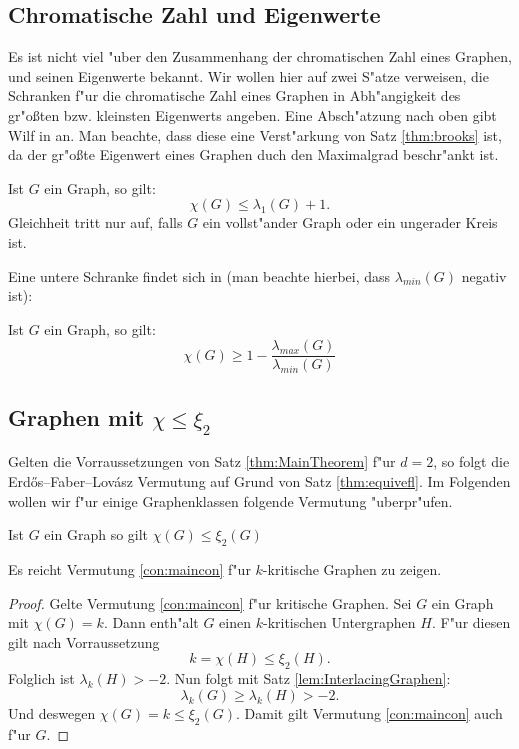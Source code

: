 \subsection{Chromatische Zahl und Eigenwerte}
Es ist nicht viel "uber den Zusammenhang der chromatischen Zahl eines Graphen, und seinen Eigenwerte bekannt. Wir wollen hier auf zwei S"atze verweisen, die Schranken f"ur die chromatische Zahl eines Graphen in Abh"angigkeit des gr"o{\ss}ten bzw. kleinsten Eigenwerts angeben. Eine Absch"atzung nach oben  gibt Wilf in \cite{wilf1967eigenvalues} an. Man beachte, dass diese eine Verst"arkung von Satz \ref{thm:brooks} ist, da der gr"o{\ss}te Eigenwert eines Graphen duch den Maximalgrad
beschr"ankt ist.

\begin{theorem}
  Ist $G$ ein Graph, so gilt: 
  $$\chi(G) \leq \lambda_{1}(G) +1.$$
  Gleichheit tritt nur auf, falls $G$ ein vollst"ander Graph oder ein ungerader Kreis ist.
  \label{thm:wilfev}
\end{theorem}

Eine untere Schranke findet sich in \cite{Hoffmanbounds} (man beachte hierbei, dass $\lambda_{min}(G)$ negativ ist):

\begin{theorem}
  Ist $G$ ein Graph, so gilt:
  $$\chi(G) \geq 1 - \frac{\lambda_{max}(G)}{\lambda_{min}(G)}$$
  \label{thm:Hoffmanev}
\end{theorem}

\subsection{Graphen mit $\chi \leq \xi_{2}$}

Gelten die Vorraussetzungen von Satz \ref{thm:MainTheorem} f"ur $d=2$, so folgt die Erd\H{o}s--Faber--Lov\'asz Vermutung auf Grund von Satz \ref{thm:equivefl}. Im Folgenden wollen wir f"ur einige Graphenklassen folgende Vermutung "uberpr"ufen.
\begin{conjecture}
  Ist $G$ ein Graph so gilt $\chi(G) \leq \xi_{2}(G)$
  \label{con:maincon}
\end{conjecture}

\begin{remark}
  Es reicht Vermutung \ref{con:maincon} f"ur $k$-kritische Graphen zu zeigen. 
\end{remark}

\begin{proof}
  Gelte Vermutung \ref{con:maincon} f"ur kritische Graphen.
  Sei $G$ ein Graph mit $\chi(G) = k$. Dann enth"alt $G$ einen $k$-kritischen Untergraphen $H$. F"ur diesen gilt nach Vorraussetzung $$k= \chi(H) \leq \xi_{2}(H).$$ Folglich ist $\lambda_{k}(H) > -2$. Nun folgt mit Satz \ref{lem:InterlacingGraphen}:
  \begin{equation*}
    \lambda_{k}(G) \geq \lambda_{k}(H) > -2.
  \end{equation*}
  Und deswegen $\chi(G) = k \leq \xi_{2}(G)$.
  Damit gilt Vermutung \ref{con:maincon} auch f"ur $G$.
\end{proof}

